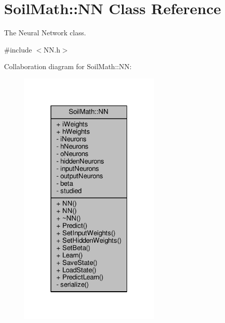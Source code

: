\hypertarget{class_soil_math_1_1_n_n}{}\section{Soil\+Math\+:\+:N\+N Class Reference}
\label{class_soil_math_1_1_n_n}


The Neural Network class.  




{\ttfamily \#include $<$N\+N.\+h$>$}



Collaboration diagram for Soil\+Math\+:\+:N\+N\+:\nopagebreak
\begin{figure}[H]
\begin{center}
\leavevmode
\includegraphics[width=193pt]{class_soil_math_1_1_n_n__coll__graph}
\end{center}
\end{figure}
